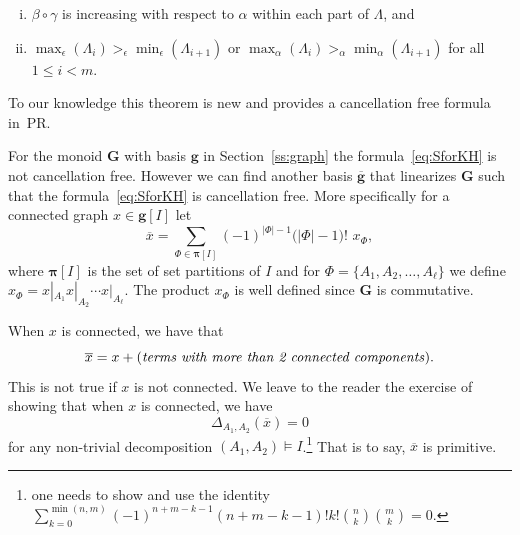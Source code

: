 \documentclass[ALCO,ThmDefs,Unicode,epreuves]{cedram}
\newcommand{\bpi}{\boldsymbol \pi}
\begin{document}
\begin{exam}
\begin{theorem}
\begin{enumerate}[(i)]
\item\label{theo4.9ii} $\beta\circ\gamma$ is increasing with respect to $\alpha$ within each part of $\Lambda$, and
\item\label{theo4.9iii} $\max_\epsilon(\Lambda_i)>_\epsilon\min_\epsilon(\Lambda_{i+1})$ or $\max_\alpha(\Lambda_i)>_\alpha \min_\alpha(\Lambda_{i+1})$ for all $1\le i<m$.
 \end{enumerate}
 \end{theorem}
 To our knowledge this theorem is new and provides a cancellation free formula in~PR.
\end{exam}

\begin{exam} For the monoid $\mathbf{G}$ with basis $\mathbf{g}$ in Section~\ref{ss:graph} the formula~\eqref{eq:SforKH} is not cancellation free. However we can find another basis $\overline{\mathbf{g}}$
 that linearizes $\mathbf{G}$ such that the formula~\eqref{eq:SforKH} is cancellation free. More specifically for a connected graph $x\in \mathbf{g}[I]$ let
 $$\overline{x}=\sum_{\Phi\in{\bpi}[I]} (-1)^{|\Phi|-1}\big (|\Phi|-1\big)!\,\, x_\Phi,$$
 where ${\bpi}[I]$ is the set of set partitions of $I$ and
 for $\Phi=\{A_1,A_2,\ldots,A_\ell\}$ we define $x_\Phi=x|_{A_1}x|_{A_2}\cdots x|_{A_\ell}$. The product $x_\Phi$ is well defined since $\mathbf{G}$ is commutative.

 When $x$ is connected, we have that 
 $$\overline{x}=x+(\text{\emph{terms with more than 2 connected components}}).$$ 
 This is not true if $x$ is not connected. 
 We leave to the reader the exercise of showing that when $x$ is connected, we have
 $$\Delta_{A_1,A_2}(\overline{x})=0$$
 for any non-trivial decomposition $(A_1,A_2)\models I$.\footnote%
 {one needs to show and use the identity ${\displaystyle \sum_{k=0}^{\min(n,m)}}(-1)^{n+m-k-1}(n+m-k-1)! k! 
 \genfrac{(}{)}{0pt}{1}{n}{k}%
 \genfrac{(}{)}{0pt}{1}{m}{k} %
 = 0$.}
 That is to say, $\overline{x}$ is primitive.
 

\end{exam}
\end{document}
